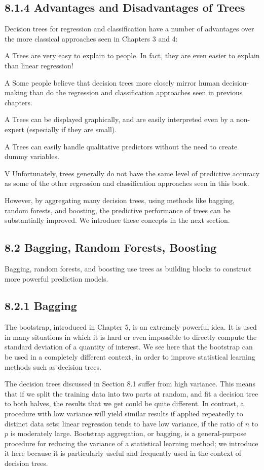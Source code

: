 \documentclass[10pt]{article}
\begin{document}
\subsection*{8.1.4 Advantages and Disadvantages of Trees}
Decision trees for regression and classification have a number of advantages over the more classical approaches seen in Chapters 3 and 4:

A Trees are very easy to explain to people. In fact, they are even easier to explain than linear regression!

A Some people believe that decision trees more closely mirror human decision-making than do the regression and classification approaches seen in previous chapters.

A Trees can be displayed graphically, and are easily interpreted even by a non-expert (especially if they are small).

A Trees can easily handle qualitative predictors without the need to create dummy variables.


V Unfortunately, trees generally do not have the same level of predictive accuracy as some of the other regression and classification approaches seen in this book.

However, by aggregating many decision trees, using methods like bagging, random forests, and boosting, the predictive performance of trees can be substantially improved. We introduce these concepts in the next section.

\subsection*{8.2 Bagging, Random Forests, Boosting}
Bagging, random forests, and boosting use trees as building blocks to construct more powerful prediction models.

\subsection*{8.2.1 Bagging}
The bootstrap, introduced in Chapter 5, is an extremely powerful idea. It is used in many situations in which it is hard or even impossible to directly compute the standard deviation of a quantity of interest. We see here that the bootstrap can be used in a completely different context, in order to improve statistical learning methods such as decision trees.

The decision trees discussed in Section 8.1 suffer from high variance. This means that if we split the training data into two parts at random, and fit a decision tree to both halves, the results that we get could be quite different. In contrast, a procedure with low variance will yield similar results if applied repeatedly to distinct data sets; linear regression tends to have low variance, if the ratio of $n$ to $p$ is moderately large. Bootstrap aggregation, or bagging, is a general-purpose procedure for reducing the variance of a statistical learning method; we introduce it here because it is particularly useful and frequently used in the context of decision trees.
\end{document}
